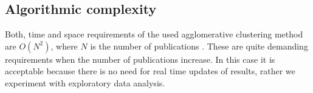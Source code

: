 \subsection{Algorithmic complexity}
Both, time and space requirements of the used agglomerative clustering 
method are $O(N^2)$, where $N$ is the number of publications 
\cite{willett_recent_1988}. These are quite demanding requirements
when the number of publications increase. In this case it is 
acceptable because there is no need for real time updates of 
results, rather we experiment with exploratory data analysis.



